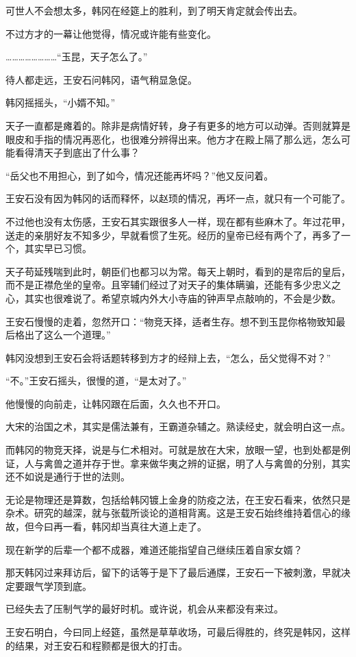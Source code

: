 可世人不会想太多，韩冈在经筵上的胜利，到了明天肯定就会传出去。

不过方才的一幕让他觉得，情况或许能有些变化。

……………………“玉昆，天子怎么了。”

待人都走远，王安石问韩冈，语气稍显急促。

韩冈摇摇头，“小婿不知。”

天子一直都是瘫着的。除非是病情好转，身子有更多的地方可以动弹。否则就算是眼皮和手指的情况再恶化，也很难分辨得出来。他方才在殿上隔了那么远，怎么可能看得清天子到底出了什么事？

“岳父也不用担心，到了如今，情况还能再坏吗？”他又反问着。

王安石没有因为韩冈的话而释怀，以赵顼的情况，再坏一点，就只有一个可能了。

不过他也没有太伤感，王安石其实跟很多人一样，现在都有些麻木了。年过花甲，送走的亲朋好友不知多少，早就看惯了生死。经历的皇帝已经有两个了，再多了一个，其实早已习惯。

天子苟延残喘到此时，朝臣们也都习以为常。每天上朝时，看到的是帘后的皇后，而不是正襟危坐的皇帝。且宰辅们经过了对天子的集体瞒骗，还能有多少忠义之心，其实也很难说了。希望京城内外大小寺庙的钟声早点敲响的，不会是少数。

王安石慢慢的走着，忽然开口：“物竞天择，适者生存。想不到玉昆你格物致知最后格出了这么一个道理。”

韩冈没想到王安石会将话题转移到方才的经辩上去，“怎么，岳父觉得不对？”

“不。”王安石摇头，很慢的道，“是太对了。”

他慢慢的向前走，让韩冈跟在后面，久久也不开口。

大宋的治国之术，其实是儒法兼有，王霸道杂辅之。熟读经史，就会明白这一点。

而韩冈的物竞天择，说是与仁术相对。可就是放在大宋，放眼一望，也到处都是例证，人与禽兽之道并存于世。拿来做华夷之辨的证据，明了人与禽兽的分别，其实还不如说是通行于世的法则。

无论是物理还是算数，包括给韩冈镀上金身的防疫之法，在王安石看来，依然只是杂术。研究的越深，就与张载所谈论的道相背离。这是王安石始终维持着信心的缘故，但今曰再一看，韩冈却当真往大道上走了。

现在新学的后辈一个都不成器，难道还能指望自己继续压着自家女婿？

那天韩冈过来拜访后，留下的话等于是下了最后通牒，王安石一下被刺激，早就决定要跟气学顶到底。

已经失去了压制气学的最好时机。或许说，机会从来都没有来过。

王安石明白，今曰同上经筵，虽然是草草收场，可最后得胜的，终究是韩冈，这样的结果，对王安石和程颢都是很大的打击。

